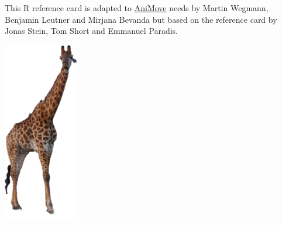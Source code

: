 \documentclass[8pt,landscape]{article}
\begin{document}
\begin{multicols*}{3}
This R reference card is adapted to \href{mailto:contact@animove.org}{AniMove} needs by Martin Wegmann, Benjamin Leutner and Mirjana Bevanda but based on the reference card by Jonas Stein, Tom Short and Emmanuel Paradis.

\bigskip

\bigskip

\begin{center}
 \includegraphics[width=.13\textwidth]{pics/earth-observation_org_WegmannBevanda_giraffe.png}
\end{center}

  
\end{multicols*}
\end{document}
